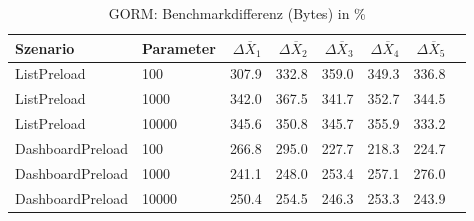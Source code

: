 
\begin{table}[ht]
\setlength{\extrarowheight}{-1pt}
\centering
\caption{GORM: Benchmarkdifferenz (Bytes) in \%}
\begin{tabular}{llrrrrrr}
\toprule
Szenario & Parameter & ${\Delta \overline{X}_1}$ & ${\Delta \overline{X}_2}$ & ${\Delta \overline{X}_3}$ & ${\Delta \overline{X}_4}$ & ${\Delta \overline{X}_5}$ \\
\midrule
	ListPreload & 100 & \cellcolor{red!30}  307.9 & \cellcolor{red!30}  332.8 & \cellcolor{red!30}  359.0 & \cellcolor{red!30}  349.3 & \cellcolor{red!30}  336.8 \\
	ListPreload & 1000 & \cellcolor{red!30}  342.0 & \cellcolor{red!30}  367.5 & \cellcolor{red!30}  341.7 & \cellcolor{red!30}  352.7 & \cellcolor{red!30}  344.5 \\
	ListPreload & 10000 & \cellcolor{red!30}  345.6 & \cellcolor{red!30}  350.8 & \cellcolor{red!30}  345.7 & \cellcolor{red!30}  355.9 & \cellcolor{red!30}  333.2 \\
	DashboardPreload & 100 & \cellcolor{red!30}  266.8 & \cellcolor{red!30}  295.0 & \cellcolor{red!30}  227.7 & \cellcolor{red!30}  218.3 & \cellcolor{red!30}  224.7 \\
	DashboardPreload & 1000 & \cellcolor{red!30}  241.1 & \cellcolor{red!30}  248.0 & \cellcolor{red!30}  253.4 & \cellcolor{red!30}  257.1 & \cellcolor{red!30}  276.0 \\
	DashboardPreload & 10000 & \cellcolor{red!30}  250.4 & \cellcolor{red!30}  254.5 & \cellcolor{red!30}  246.3 & \cellcolor{red!30}  253.3 & \cellcolor{red!30}  243.9 \\
\bottomrule
\end{tabular}
\label{tab:benchmarkdifferenz_gorm_bytes}
\end{table}
	